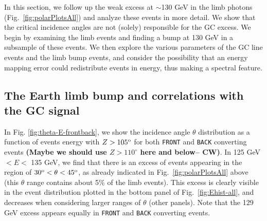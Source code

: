 \documentclass[aps,twocolumn,prd,superscriptaddress,showpacs,nofootinbib,fixfloat]{revtex4}
\newcommand{\Fermi}{{\slshape Fermi}}
\newcommand{\degree}{^{\rm o}}
\newcommand{\zrock}{$Z_{\rm rock}$}
\def\la{\vcenter{\hbox{$<$}\offinterlineskip\hbox{$\sim$}}}
\newcommand\Refsec[1]{Section \ref{sec:#1}}
\begin{document}
In this section, we follow up the weak excess at $\sim$130 GeV 
in the limb photons
(Fig.~\ref{fig:polarPlotsAll})
and
analyze these events in more detail. We show that the
critical incidence angles are not (solely) responsible for
the GC excess.
We begin by examining the limb events and finding a bump at
130 GeV in a subsample of these events. 
We then explore the various
parameters of the GC line events and the limb bump events, and 
consider the possibility
that an energy mapping error could redistribute events in energy,
thus making a spectral feature.  

\subsection{The Earth limb bump and correlations with the GC signal}

In Fig. \ref{fig:theta-E-frontback}, we show the incidence angle
$\theta$ distribution as a function of events energy with $Z
> 105\degree$ for both \texttt{FRONT} and \texttt{BACK}
converting events \textbf{(Maybe we should use $Z>110^\circ$ here and below--
CW)}.  
%
In 125 GeV $< E <$ 135 GeV, we find that there is an excess
of events appearing in the region of $30\degree < \theta <
45\degree$, as already indicated in Fig.~\ref{fig:polarPlotsAll} above
(this $\theta$ range contains about 5\% of the limb
events). This excess is clearly visible in the event distribution plotted in
the bottom panel of Fig.~\ref{fig:Ehist-all}, and decreases when
considering larger ranges of $\theta$ (other panels).
Note that the 129 GeV excess appears equally in \texttt{FRONT} and
\texttt{BACK} converting events. %
\end{document}
